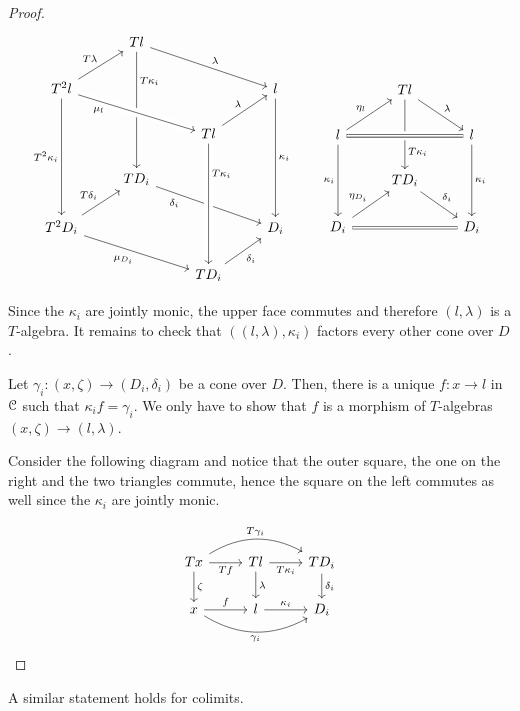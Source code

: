 \documentclass[a4paper,11pt,oneside,openany]{scrbook}
\begin{document}
\begin{proof}
	\[
		\begin{tikzcd}
			& Tl\ar[drr, "\lambda"]\ar[ddd, "T\kappa_i" near start] \\
			T^2l\ar[ur, "T\lambda"]\ar[drr, crossing over, "\mu_l" near start, swap]\ar[ddd, "T^2\kappa_i"']
			&&& l\ar[ddd, "\kappa_i"] \\
			&& Tl\ar[ur, "\lambda"]%
			\\
			& TD_i\ar[drr, swap, "\delta_i" near start] \\
			T^2D_i\ar[ur, "T\delta_i"]\ar[drr, "\mu_{D_i}"']
			&&& D_i \\
			&& TD_i\ar[ur, "\delta_i"'] \ar[from=uuu,crossing over,  "T\kappa_i" near start]
		\end{tikzcd}
		\quad\quad
		\begin{tikzcd}
			& Tl\ar[dr, "\lambda"]\ar[dd, "T\kappa_i" near end] \\
			l\ar[ur, "\eta_l"]\ar[rr, crossing over, equal]\ar[dd, swap, "\kappa_i"]
			&& l\ar[dd, "\kappa_i"] \\
			& TD_i\ar[dr, "\delta_i"] \\
			D_i\ar[ur, "\eta_{D_i}"]\ar[rr, equal]
			&& D_i
		\end{tikzcd}
	\]

	Since the $\kappa_i$ are jointly monic, the upper face commutes and therefore $(l,\lambda)$ is a $T$-algebra. It remains to check that $((l,\lambda),\kappa_i)$ factors every other cone over $D$.

	Let $\gamma_i\colon(x,\zeta)\rightarrow (D_i,\delta_i)$ be a cone over $D$. Then, there is a unique $f\colon x\rightarrow l$ in $\operatorname{\mathcal{C}}$ such that $\kappa_if=\gamma_i$. We only have to show that $f$ is a morphism of $T$-algebras $(x,\zeta)\rightarrow (l,\lambda)$.

	Consider the following diagram and notice that the outer square, the one on the right and the two triangles commute, hence the square on the left commutes as well since the $\kappa_i$ are jointly monic.

	\[
		\begin{tikzcd}
			Tx\ar[rr, bend left, "T\gamma_i"]\ar[r, swap, "Tf"]\ar[d, "\zeta"]
			& Tl\ar[r, swap, "T\kappa_i"]\ar[d, "\lambda"]
			& TD_i\ar[d, "\delta_i"] \\
			x\ar[r, "f"]\ar[rr, bend right, swap, "\gamma_i"]
			& l\ar[r, "\kappa_i"]
			& D_i
		\end{tikzcd}
	\]
\end{proof}

A similar statement holds for colimits.
\end{document}

